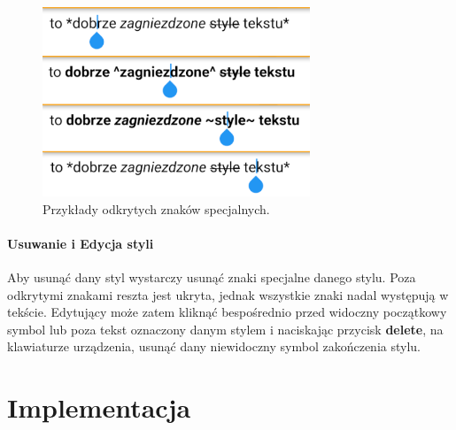 \documentclass[shortabstract]{iithesis}
\begin{document}
\begin{figure}[h]
    \centering
    \includegraphics[width=8cm]{images/pokazywanie_znakow_specjalnych.png}
    \caption{Przykłady odkrytych znaków specjalnych.}
    \vspace{3mm}
\end{figure}

\subsubsection{Usuwanie i Edycja styli}

Aby usunąć dany styl wystarczy usunąć znaki specjalne danego stylu. Poza odkrytymi znakami reszta jest ukryta, jednak wszystkie znaki nadal występują w tekście. Edytujący może zatem kliknąć bespośrednio przed widoczny początkowy symbol lub poza tekst oznaczony danym stylem i naciskając przycisk \textbf{delete}, na klawiaturze urządzenia, usunąć dany niewidoczny symbol zakończenia stylu.

\chapter{Implementacja}


\end{document}
